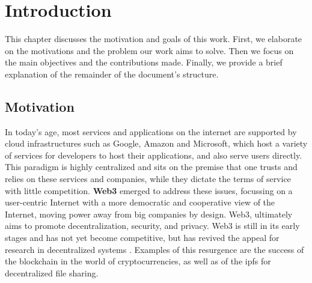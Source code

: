 
%

\chapter{Introduction}
\label{cha:introduction}


\epigraphfontsize{\small\itshape}
\setlength\epigraphwidth{12.5cm}
\setlength\epigraphrule{0pt}

This chapter discusses the motivation and goals of this work. First, we elaborate on the motivations and the problem our work aims to solve. Then we focus on the main objectives and the contributions made. Finally, we provide a brief explanation of the remainder of the document's structure.

\section*{Motivation}
\label{sec:motivation}

In today's age, most services and applications on the internet are supported by cloud infrastructures such as Google, Amazon and Microsoft\cite{Taaffe2021}, which host a variety of services for developers to host their applications, and also serve users directly. This paradigm is highly centralized  and sits on the premise that one trusts and relies on these services and companies, while they dictate the terms of service with little competition. \textbf{Web3} emerged to address these issues, focussing on a user-centric Internet with a more democratic and cooperative view of the Internet, moving power away from big companies by design. Web3, ultimately aims to promote decentralization, security, and privacy. Web3 is still in its early stages and has not yet become competitive, but has revived the appeal for research in decentralized systems \cite{Costa2023}. Examples of this resurgence are the success of the blockchain in the world of cryptocurrencies\cite{Nofer2017}, as well as of the \gls{ipfs} for decentralized file sharing\cite{IPFS2015}.


